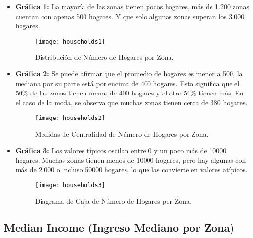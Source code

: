 \documentclass[a4paper, 10pt]{article}
\begin{document}
\begin{itemize}
    \item \textbf{Gráfica 1:} La mayoría de las zonas tienen pocos hogares, más de 1.200 zonas cuentan con apenas 500 hogares. Y que solo algunas zonas superan los 3.000 hogares.
    \begin{figure}[H]
        \centering
        \texttt{[image: households1]}
        \caption{Distribución de Número de Hogares por Zona.}
    \end{figure}

    \item \textbf{Gráfica 2:} Se puede afirmar que el promedio de hogares es menor a 500, la mediana por su parte está por encima de 400 hogares. Esto significa que el 50\% de las zonas tienen menos de 400 hogares y el otro 50\% tienen más. En el caso de la moda, se observa que muchas zonas tienen cerca de 380 hogares.
    \begin{figure}[H]
        \centering
        \texttt{[image: households2]}
        \caption{Medidas de Centralidad de Número de Hogares por Zona.}
    \end{figure}

    \item \textbf{Gráfica 3:} Los valores típicos oscilan entre 0 y un poco más de 10000 hogares. Muchas zonas tienen menos de 10000 hogares, pero hay algunas con más de 2.000 o incluso 50000 hogares, lo que las convierte en valores atípicos.
    \begin{figure}[H]
        \centering
        \texttt{[image: households3]}
        \caption{Diagrama de Caja de Número de Hogares por Zona.}
    \end{figure}
\end{itemize}



\subsection{Median Income (Ingreso Mediano por Zona)}
\end{document}
